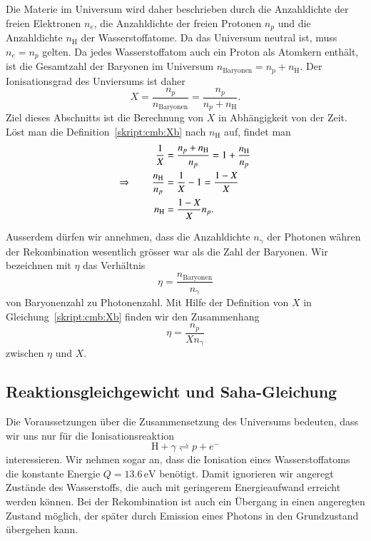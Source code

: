 Die Materie im Universum wird daher beschrieben durch die Anzahldichte
der freien Elektronen $n_e$, die Anzahldichte der freien Protonen $n_p$
und die Anzahldichte $n_\text{H}$ der Wasserstoffatome.
Da das Universum neutral ist, muss $n_e=n_p$ gelten.
Da jedes Wasserstoffatom auch ein Proton als Atomkern enthält, ist die
Gesamtzahl der Baryonen im Universum $n_\text{Baryonen} = n_p+n_\text{H}$.
Der Ionisationsgrad des Unviersums ist daher
\begin{equation}
X=\frac{n_p}{n_\text{Baryonen}}=\frac{n_p}{n_p+n_\text{H}}.
\label{skript:cmb:Xb}
\end{equation}
Ziel dieses Abschnitts ist die Berechnung von $X$ in Abhängigkeit 
von der Zeit.
Löst man die Definition~\eqref{skript:cmb:Xb} nach $n_\text{H}$ auf,
findet man
\begin{align}
\frac1X
&=
\frac{n_p+n_\text{H}}{n_p}
=
1+
\frac{n_\text{H}}{n_p}
\notag
\\
\Rightarrow
\qquad
\frac{n_\text{H}}{n_p}
&=
\frac{1}{X}-1
=
\frac{1-X}{X}
\notag
\\
n_\text{H}
&=
\frac{1-X}{X}n_p.
\label{skript:cmb:XnH}
\end{align}

Ausserdem dürfen wir annehmen, dass die Anzahldichte $n_\gamma$
der Photonen währen der Rekombination wesentlich grösser war als
die Zahl der Baryonen.
Wir bezeichnen mit $\eta$ das Verhältnis
\[
\eta = \frac{n_\text{Baryonen}}{n_\gamma}
\]
von Baryonenzahl zu Photonenzahl.
Mit Hilfe der Definition von $X$ in Gleichung~\eqref{skript:cmb:Xb}
finden wir den Zusammenhang
\begin{equation}
\eta = \frac{n_p}{Xn_\gamma}
\label{skript:cmb:etaX}
\end{equation}
zwischen $\eta$ und $X$.

\subsection{Reaktionsgleichgewicht und Saha-Gleichung}
Die Voraussetzungen über die Zusammensetzung des Universums bedeuten,
dass wir uns nur für die Ionisationsreaktion
\begin{equation}
\text{H} + \gamma 
\rightleftharpoons
p + e^-
\label{skript:cmb:reaktionsgleichung}
\end{equation}
interessieren.
Wir nehmen sogar an, dass die Ionisation eines Wasserstoffatoms 
die konstante Energie $Q=13.6\,\text{eV}$ benötigt.
Damit ignorieren wir angeregt Zustände des Wasserstoffs, die auch
mit geringerem Energieaufwand erreicht werden können.
Bei der Rekombination ist auch ein Übergang in einen angeregten
Zustand möglich, der später durch Emission eines Photons in den Grundzustand
übergehen kann.

